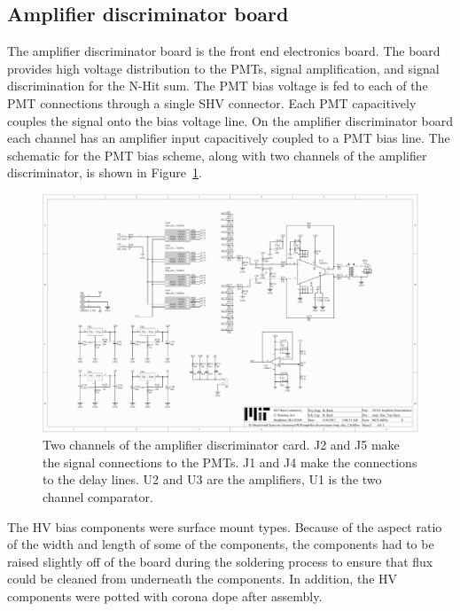 \documentclass{JINST}
\begin{document}
\subsection{Amplifier discriminator board}
\label{sec:Amp-Disc}
%
The amplifier discriminator board is the front end electronics board.
The board provides high voltage distribution to the PMTs, signal
amplification, and signal discrimination for the N-Hit sum. The PMT
bias voltage is fed to each of the PMT connections through a single
SHV connector. Each PMT capacitively couples the signal onto the bias
voltage line. On the amplifier discriminator board each channel has
an amplifier input capacitively coupled to a PMT bias line. The schematic for the
PMT bias scheme, along with two channels of the amplifier discriminator, is shown in Figure~\ref{fig:ampdiscsch}.

\begin{figure}[ht]
\begin{center}
\includegraphics[width=5.5in, keepaspectratio=true, page=2, trim=4.54in 2.12in 4.54in 2.12in, clip=true]{graphics/veto_sch.pdf}
\caption{Two channels of the amplifier discriminator card. J2 and J5 make the signal connections to the PMTs. J1 and J4 make the connections to the delay lines. U2 and U3 are the amplifiers, U1 is the two channel comparator.
\label{fig:ampdiscsch}}
\end{center}
\end{figure}

The HV bias components were surface mount types. Because of the
aspect ratio of the width and length of some of the components, the
components had to be raised slightly off of the board during the
soldering process to ensure that flux could be cleaned from underneath
the components. In addition, the HV components were potted with
corona dope after assembly.
\end{document}
